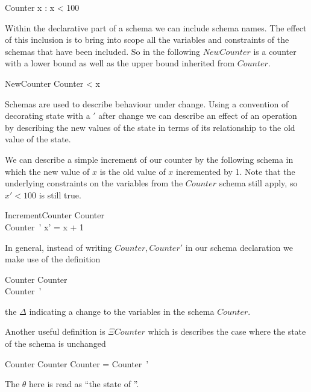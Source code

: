 \begin{schema}{Counter}
x : \nat
\where
x < 100
\end{schema} 

Within the declarative part of a schema we can include schema
names. The effect of this inclusion is to bring into scope all the
variables and constraints of the schemas that have been included.
So in the following $NewCounter$ is a counter with a lower bound as
well as the upper bound inherited from $Counter$.

\begin{schema}{NewCounter}
        Counter
 < x
\end{schema}

Schemas are used to describe behaviour under change. Using a
convention of decorating state with a $'$ after change we can describe an
effect of an operation by describing the new values of the state in
terms of its relationship to
the old value of the state.  

We can describe a simple increment
of our counter by the following schema in which the new value of $x$
is the old value of $x$ incremented by 1. Note that the underlying
constraints on the variables from the $Counter$ schema still apply, so
$x' < 100$ is still true.
\begin{schema}{IncrementCounter}
        Counter
\\      Counter~'
\where
x' = x + 1
\end{schema}

In general, instead of writing $Counter, Counter'$ in our schema declaration we
make use of the definition
\begin{schema}{\Delta Counter}
        Counter
\\      Counter~'
\end{schema}

the $\Delta$ indicating a change to the variables in the schema $Counter$.

Another useful definition is $\Xi Counter$ which is describes the case
where the state of the schema is unchanged
\begin{schema}{\Xi Counter}
        \Delta Counter
\where
        \theta Counter = \theta Counter~'
\end{schema} 
\begin{Zcomment}
\item
The $\theta$ here is read as ``the state of ''.
\end{Zcomment}

